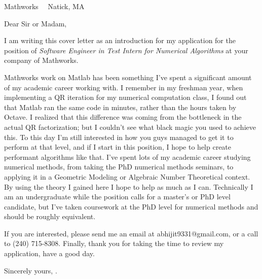 \documentclass{scrlttr2}
\renewcommand{\\}{\ {\large\textperiodcentered}\ }
\begin{document}

\begin{letter}{ %
Mathworks\\
Natick, MA\\
}

\opening{Dear Sir or Madam,}

I am writing this cover letter as an introduction for my application for the
position of \textit{Software Engineer in Test Intern for Numerical Algorithms}
at your company of Mathworks.

Mathworks work on Matlab has been something I've spent a significant amount of
my academic career working with. I remember in my freshman year, when
implementing a QR iteration for my numerical computation class, I found out that
Matlab ran the same code in minutes, rather than the hours taken by Octave. I
realized that this difference was coming from the bottleneck in the actual QR
factorization; but I couldn't see what black magic you used to achieve this. To
this day I'm still interested in how you guys managed to get it to perform at
that level, and if I start in this position, I hope to help create performant
algorithms like that. I've spent lots of my academic career studying numerical
methods, from taking the PhD numerical methods seminars, to applying it in a
Geometric Modeling or Algebraic Number Theoretical context. By using the theory
I gained here I hope to help as much as I can. Technically I am an undergraduate
while the position calls for a master's or PhD level candidate, but I've taken
coursework at the PhD level for numerical methods and should be roughly
equivalent.

If you are interested, please send me an email at abhijit9331@gmail.com, or a
call to (240) 715-8308. Finally, thank you for taking the time to review my
application, have a good day. \\

Sincerely yours, 
.


\end{letter}
\end{document}
